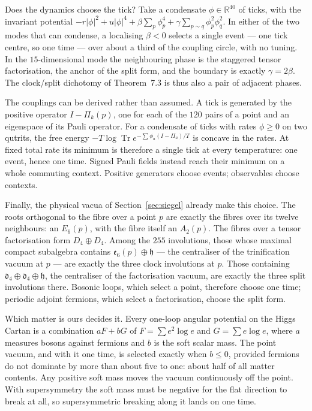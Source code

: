 Does the dynamics choose the tick? Take a condensate $\phi\in\mathbb R^{40}$ of ticks, with the invariant potential $-r|\phi|^2+u|\phi|^4+\beta\sum_p\phi_p^4+\gamma\sum_{p\sim q}\phi_p^2\phi_q^2$. In either of the two modes that can condense, a localising $\beta<0$ selects a single event --- one tick centre, so one time --- over about a third of the coupling circle, with no tuning. In the $15$-dimensional mode the neighbouring phase is the staggered tensor factorisation, the anchor of the split form, and the boundary is exactly $\gamma=2\beta$. The clock/split dichotomy of Theorem~7.3 is thus also a pair of adjacent phases. 

The couplings can be derived rather than assumed. A tick is generated by the positive operator $I-\Pi_k(p)$, one for each of the $120$ pairs of a point and an eigenspace of its Pauli operator. For a condensate of ticks with rates $\phi\ge0$ on two qutrits, the free energy $-T\log\operatorname{Tr}e^{-\sum\phi_a(I-\Pi_a)/T}$ is concave in the rates. At fixed total rate its minimum is therefore a single tick at every temperature: one event, hence one time. Signed Pauli fields instead reach their minimum on a whole commuting context. Positive generators choose events; observables choose contexts. 

Finally, the physical vacua of Section~\ref{sec:siegel} already make this choice. The roots orthogonal to the fibre over a point $p$ are exactly the fibres over its twelve neighbours: an $E_6(p)$, with the fibre itself an $A_2(p)$. The fibres over a tensor factorisation form $D_4\oplus D_4$. Among the $255$ involutions, those whose maximal compact subalgebra contains $\mathfrak e_6(p)\oplus\mathfrak h$ --- the centraliser of the trinification vacuum at $p$ --- are exactly the three clock involutions at $p$. Those containing $\mathfrak d_4\oplus\mathfrak d_4\oplus\mathfrak h$, the centraliser of the factorisation vacuum, are exactly the three split involutions there. Bosonic loops, which select a point, therefore choose one time; periodic adjoint fermions, which select a factorisation, choose the split form. 

Which matter is ours decides it. Every one-loop angular potential on the Higgs Cartan is a combination $aF+bG$ of $F=\sum e^2\log e$ and $G=\sum e\log e$, where $a$ measures bosons against fermions and $b$ is the soft scalar mass. The point vacuum, and with it one time, is selected exactly when $b\le0$, provided fermions do not dominate by more than about five to one: about half of all matter contents. Any positive soft mass moves the vacuum continuously off the point. With supersymmetry the soft mass must be negative for the flat direction to break at all, so supersymmetric breaking along it lands on one time. 

